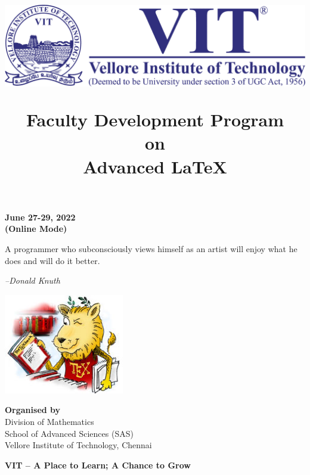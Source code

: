 
	\title{
		\includegraphics[width=.5\textwidth]{img/vitlogo}
		
		\Large\color{Maroon}\setmainfont{calligrapher}
		\bf
		Faculty Development Program \\ on \\
		\Huge Advanced \LaTeX
	}
	\date{}



\maketitle

\vspace{-5\baselineskip}
\begin{center}
	\large \bf
	June 27-29, 2022 \\
\textcolor{secondaryColor}{(Online Mode)}
\end{center}



\begin{shadequote}
	
	\vspace{10pt}
	A programmer who subconsciously views himself as an artist will enjoy what he does and will do it better.
	
	\hfill \emph{--Donald Knuth}
	
\end{shadequote}

\begin{center}
	\includegraphics[width=.6\textwidth]{img/lion}
\end{center}
\vspace{-2\baselineskip}
\begin{center}
\textcolor{primaryColor}{\textbf{Organised by}} \\
Division of Mathematics\\
School of Advanced Sciences (SAS)\\
Vellore Institute of Technology, Chennai
\end{center}
%
\begin{center}
	\color{primaryColor} 
	\small \bf
	VIT -- A Place to Learn; A Chance to Grow
\end{center}

